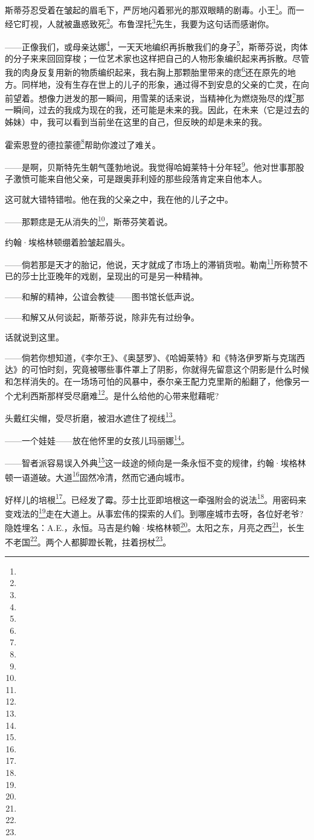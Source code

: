 \par 斯蒂芬忍受着在皱起的眉毛下，严厉地闪着邪光的那双眼睛的剧毒。小王\footnote{}。而一经它盯视，人就被蛊惑致死\footnote{}。布鲁涅托\footnote{}先生，我要为这句话而感谢你。
\par ——正像我们，或母亲达娜\footnote{}，一天天地编织再拆散我们的身子\footnote{}，斯蒂芬说，肉体的分子来来回回穿梭；一位艺术家也这样把自己的人物形象编织起来再拆散。尽管我的肉身反复用新的物质编织起来，我右胸上那颗胎里带来的痣\footnote{}还在原先的地方。同样地，没有生存在世上的儿子的形象，通过得不到安息的父亲的亡灵，在向前望着。想像力迸发的那一瞬间，用雪莱的话来说，当精神化为燃烧殆尽的煤\footnote{}那一瞬间，过去的我成为现在的我，还可能是未来的我。因此，在未来（它是过去的姊妹）中，我可以看到当前坐在这里的自己，但反映的却是未来的我。
\par 霍索恩登的德拉蒙德\footnote{}帮助你渡过了难关。
\par ——是啊，贝斯特先生朝气蓬勃地说。我觉得哈姆莱特十分年轻\footnote{}。他对世事那股子激愤可能来自他父亲，可是跟奥菲利娅的那些段落肯定来自他本人。
\par 这可就大错特错啦。他在我的父亲之中，我在他的儿子之中。
\par ——那颗痣是无从消失的\footnote{}，斯蒂芬笑着说。
\par 约翰·埃格林顿绷着脸皱起眉头。
\par ——倘若那是天才的胎记，他说，天才就成了市场上的滞销货啦。勒南\footnote{}所称赞不已的莎士比亚晚年的戏剧，呈现出的可是另一种精神。
\par ——和解的精神，公谊会教徒——图书馆长低声说。
\par ——和解又从何谈起，斯蒂芬说，除非先有过纷争。
\par 话就说到这里。
\par ——倘若你想知道，《李尔王》、《奥瑟罗》、《哈姆莱特》和《特洛伊罗斯与克瑞西达》的可怕时刻，究竟被哪些事件罩上了阴影，你就得先留意这个阴影是什么时候和怎样消失的。在一场场可怕的风暴中，泰尔亲王配力克里斯的船翻了，他像另一个尤利西斯那样受尽磨难\footnote{}。是什么给他的心带来慰藉呢?
\par 头戴红尖帽，受尽折磨，被泪水遮住了视线\footnote{}。
\par ——一个娃娃——放在他怀里的女孩儿玛丽娜\footnote{}。
\par ——智者派容易误入外典\footnote{}这一歧途的倾向是一条永恒不变的规律，约翰·埃格林顿一语道破。大道\footnote{}固然冷清，然而它通向城市。
\par 好样儿的培根\footnote{}。已经发了霉。莎士比亚即培根这一牵强附会的说法\footnote{}。用密码来变戏法的\footnote{}走在大道上。从事宏伟的探索的人们。到哪座城市去呀，各位好老爷?隐姓埋名：A.E.，永恒。马吉是约翰·埃格林顿\footnote{}。太阳之东，月亮之西\footnote{}，长生不老国\footnote{}。两个人都脚蹬长靴，拄着拐杖\footnote{}。
